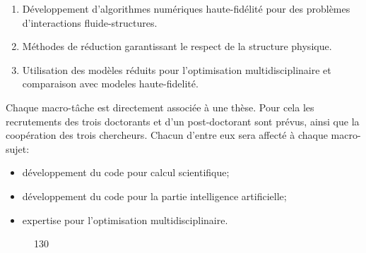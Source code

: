 \documentclass[french]{article}
\begin{document}
\begin{enumerate}
	\item Développement d'algorithmes numériques haute-fidélité pour des problèmes d'interactions fluide-structures.
	\item Méthodes de réduction garantissant le respect de la structure physique. 
	\item Utilisation des modèles réduits pour l'optimisation multidisciplinaire et comparaison avec modeles haute-fidelité.
\end{enumerate}

Chaque macro-tâche est directement associ\'ee \`a une thèse. Pour cela les recrutements des trois doctorants et d'un post-doctorant sont prévus, ainsi que la coopération des trois chercheurs. Chacun d'entre eux sera affecté \`a chaque macro-sujet:
\begin{itemize}
\item développement du code pour calcul scientifique;
\item développement du code pour la partie intelligence artificielle;
\item expertise pour l'optimisation multidisciplinaire.
\end{itemize} 
\begin{figure}[h!]
	\begin{center}
	\begin{ganttchart}[y unit title=0.6cm,
		y unit chart=0.6cm, 
		x unit=0.4cm,
		vgrid,hgrid, 
		title label anchor/.style={below=-1.6ex},
		title left shift=.05,
		title right shift=-.05,
		title height=1,
		progress label text={},
		bar height=0.7,
		group right shift=0,
		group top shift=.6,
		group height=.4]{1}{30}
		 \\
		 \\
		 \\
		 \\
		 \\
		 \\
		 \\
		 \\
		 \\
	\end{ganttchart}
	\end{center}		
\end{figure}
\end{document}
